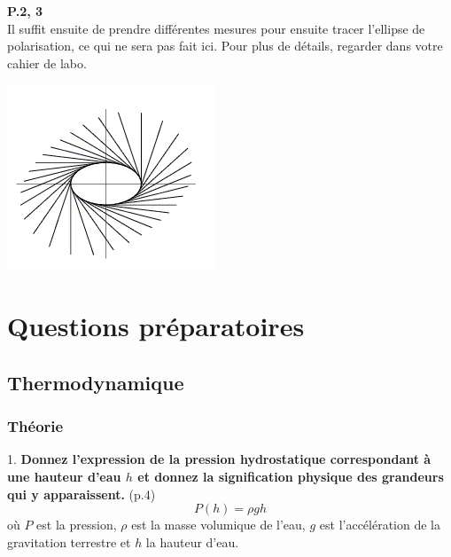 \documentclass	[11pt, a4paper, openany]{book}
\begin{document}
		\textbf{P.2, 3}\\
		Il suffit ensuite de prendre différentes mesures pour ensuite tracer l'ellipse de polarisation, ce qui ne sera pas fait ici. Pour plus de détails, regarder dans votre cahier de labo.
		\begin{center}
			\includegraphics[scale=0.8]{labo/image7.png}
		\end{center}
		
		
		
		
		
		
		
		
		
		
		
		
		
		
		
		
		
		
		
		
		
		
		
		
		
		
		
		
		
		
		
		
		
		
		
		
		
		
		
		
		
		
		
		
		
		
		
		\chapter{Questions préparatoires}
		\section{Thermodynamique}
		\newcommand{\quest}[3]{#1. \textbf{#3} (p.#2)}
		\subsection{Théorie}
		\quest{1}{4}{Donnez l'expression de la pression hydrostatique correspondant à une hauteur d'eau $h$ et donnez la signification physique des grandeurs qui y apparaissent.}
		$$P(h) = \rho g h$$ où $P$ est la pression, $\rho$ est la masse volumique de l’eau, $g$ est l’accélération de la gravitation terrestre et $h$ la hauteur d’eau.
			
\end{document}
